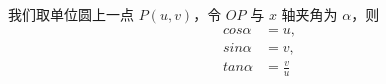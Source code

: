 
我们取单位圆上一点 $P(u,v)$，令 $OP$ 与 $x$ 轴夹角为 $\alpha$，则 
\begin{equation}
\begin{aligned}
cos\alpha &= u,\\
sin\alpha &= v,\\
tan\alpha &= \frac{v}{u}
\end{aligned}
\end{equation}